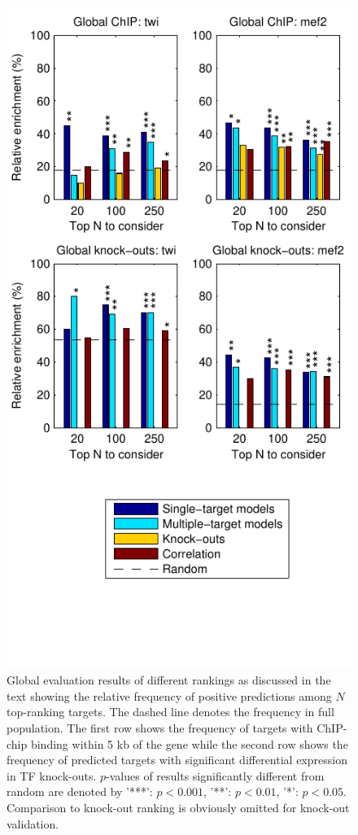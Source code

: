 \documentclass{pnastwo}
\begin{document}
\begin{article}
\begin{figure}[tb]
  \centering
  \includegraphics[trim=0mm 18mm 0mm 0mm]{dros_global_evaluation}
  \caption{Global evaluation results of different rankings as
    discussed in the text showing the relative frequency of positive
    predictions among $N$ top-ranking targets.
    The dashed line
    denotes the frequency in full population.
    The first row shows the frequency of targets with ChIP-chip
    binding within 5 kb of the gene
    while the second row shows the frequency of
    predicted targets with significant differential
    expression in TF knock-outs.
    $p$-values of results significantly different from random are
    denoted by '***': $p <
    0.001$, '**': $p < 0.01$, '*': $p < 0.05$.
    Comparison to knock-out ranking is obviously omitted for knock-out
    validation.
  }
  \label{fig:dros_global_evaluation}
\end{figure}


\end{article}
\end{document}

